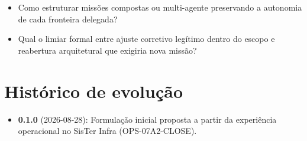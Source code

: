 \begin{itemize}
  \item Como estruturar missões compostas ou multi-agente preservando a
    autonomia de cada fronteira delegada?
  \item Qual o limiar formal entre ajuste corretivo legítimo dentro do escopo
    e reabertura arquitetural que exigiria nova missão?
\end{itemize}

\section{Histórico de evolução}

\begin{itemize}
  \item \textbf{0.1.0} (2026-08-28): Formulação inicial proposta a partir da
    experiência operacional no SisTer Infra (OPS-07A2-CLOSE).
\end{itemize}
